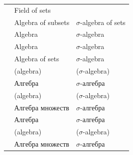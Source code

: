 \begin{remark}
\begin{table}
\begin{tabular}{l l l}
      \cite[113; 118]{Grätzer2011LatticeTheory}                              & Field of sets                                         &                                                    \\
      \cite[294; 49]{WheedenZygmund2015MeasureAndIntegral}                   & Algebra of subsets                                    & \( \sigma \)-algebra of sets                       \\
      \cite[1; 2]{Cohn2013MeasureTheory}                                     & Algebra                                               & \( \sigma \)-algebra                               \\
      \cite[2]{Çinlar2011ProbabilityAndStochastics}                          & Algebra                                               & \( \sigma \)-algebra                               \\
      \cite[3; 4]{Bobrowski2005FunctionalAnalysis}                           & Algebra of sets                                       & \( \sigma \)-algebra                               \\
                                                                             & \footnotesize (algebra)                               & \footnotesize (\( \sigma \)-algebra)               \\
      \cite[50]{КанторовичАкилов1984ФункциональныйАнализ}                    & Алгебра                                               & \( \sigma \)-алгебра                               \\
                                                                             & \footnotesize (algebra)                               & \footnotesize (\( \sigma \)-algebra)               \\
      \cite[def. I.5.1; def. I.5.3]{КолмогоровФомин2009ФункциональныйАнализ} & Алгебра множеств                                      & \( \sigma \)-алгебра                               \\
      \cite[def. 1.2]{ДьяченкоУльянов1998МераИИнтеграл}                      & Алгебра                                               & \( \sigma \)-алгебра                               \\
                                                                             & \footnotesize (algebra)                               & \footnotesize (\( \sigma \)-algebra)               \\
      \cite[def. 2.1; def. 2.2]{Боровков1999ТеорияВероятностей}              & Алгебра множеств                                      & \( \sigma \)-алгебра                               \\

\end{tabular}
\end{table}
\end{remark}
